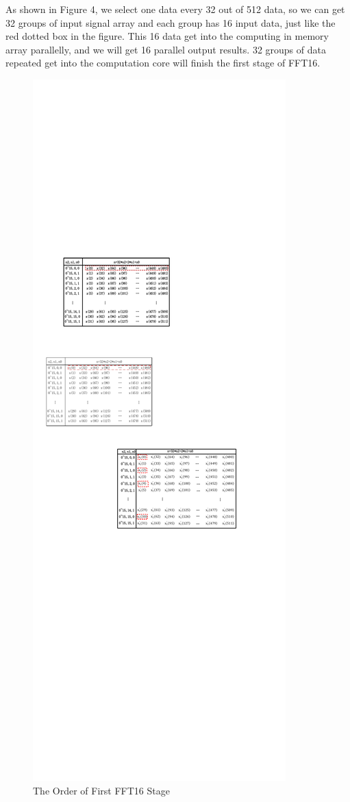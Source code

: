 \documentclass[journal]{IEEEtran}
\begin{document}
As shown in Figure 4, we select one data every 32 out of 512 data, so we can get 32 groups of input signal array and each group has 16 input data, just like the red dotted box in the figure. This 16 data get into the computing in memory array parallelly, and we will get 16 parallel output results. 32 groups of data repeated get into the computation core  will finish the first stage of FFT16.
\begin{figure}[h]
\centering
\includegraphics[scale=1]{figures/figure4.pdf}
\caption{The Order of First FFT16 Stage }
\end{figure}
\end{document}

